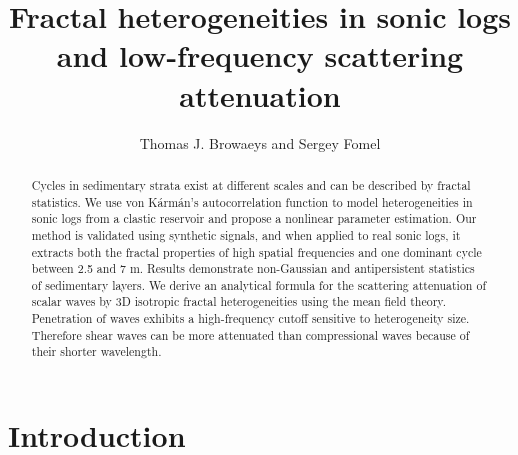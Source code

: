 

%





\title{Fractal heterogeneities in sonic logs\\ and low-frequency scattering attenuation}

\renewcommand{\thefootnote}{\fnsymbol{footnote}} 


\author{Thomas J. Browaeys and Sergey Fomel}

\footer{}

\maketitle




\begin{abstract}
Cycles in sedimentary strata exist at different scales
and can be described by fractal statistics.
We use von K\'arm\'an's autocorrelation function
to model heterogeneities in sonic logs from a clastic reservoir and
propose a nonlinear parameter estimation.
Our method is validated using synthetic signals,
and when applied to real sonic logs, it extracts both
the fractal properties of high spatial frequencies and one dominant cycle between 2.5 and 7 m.
Results demonstrate non-Gaussian and antipersistent statistics of sedimentary layers.
We derive an analytical formula for the scattering attenuation of scalar waves 
by 3D isotropic fractal heterogeneities using the mean field theory.
Penetration of waves exhibits a high-frequency cutoff sensitive to heterogeneity size.
Therefore shear waves can be more attenuated than compressional waves because of their shorter wavelength.
\end{abstract}


\section{Introduction}


